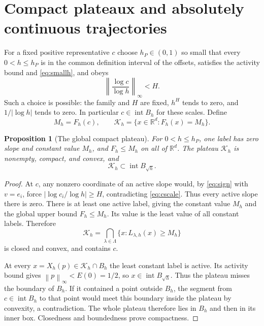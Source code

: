 \documentclass[11pt]{article}
\newtheorem{proposition}[theorem]{Proposition}
\theoremstyle{definition}
\theoremstyle{remark}
\newcommand{\R}{\mathbb R}
\newcommand{\norm}[1]{\left\|#1\right\|}
\newcommand{\intr}{\operatorname{int}}
\numberwithin{equation}{section}
\begin{document}
\section{Compact plateaux and absolutely continuous trajectories}
\label{sec:plateau}

For a fixed positive representative $c$ choose $h_P\in(0,1)$
so small that every $0<h\leq h_P$ is in the common definition
interval of the offsets, satisfies the activity bound and
\eqref{eq:smallh}, and obeys
\begin{equation}
 \norm{\frac{\log c}{\log h}}_\infty<H.
 \label{eq:cscale}
\end{equation}
Such a choice is possible: the family and $H$ are fixed, $h^H$
tends to zero, and $1/|\log h|$ tends to zero. In particular
$c\in\intr B_h$ for these scales. Define
\[
 M_h=F_h(c),\qquad \mathcal K_h=\{x\in\R^d:F_h(x)=M_h\}.
\]

\begin{proposition}[The global compact plateau]
\label{prop:plateau}
For $0<h\leq h_P$, one label has zero slope and constant value
$M_h$, and $F_h\leq M_h$ on all of $\R^d$. The plateau
$\mathcal K_h$ is nonempty, compact, and convex, and
\begin{equation}
 \mathcal K_h\subset\intr B_{\sqrt h}.
 \label{eq:innerbox}
\end{equation}
\end{proposition}
\begin{proof}
At $c$, any nonzero coordinate of an active slope would, by
\eqref{eq:sign} with $v=e_i$, force
$|\log c_i/\log h|\geq H$, contradicting \eqref{eq:cscale}.
Thus every active slope there is zero. There is at least one
active label, giving the constant value $M_h$ and the global
upper bound $F_h\leq M_h$. Its value is the least value of all
constant labels. Therefore
\begin{equation}
 \mathcal K_h=\bigcap_{\lambda\in\Lambda}
                 \{x:L_{\lambda,h}(x)\geq M_h\}
 \label{eq:polytope}
\end{equation}
is closed and convex, and contains $c$.

At every $x=X_h(p)\in\mathcal K_h\cap B_h$ the least constant
label is active. Its activity bound gives
$\norm{p}_\infty<E(0)=1/2$, so
$x\in\intr B_{\sqrt h}$. Thus the plateau misses the boundary
of $B_h$. If it contained a point outside $B_h$, the segment
from $c\in\intr B_h$ to that point would meet this boundary
inside the plateau by convexity, a contradiction. The whole
plateau therefore lies in $B_h$ and then in its inner box.
Closedness and boundedness prove compactness.
\end{proof}
\end{document}
